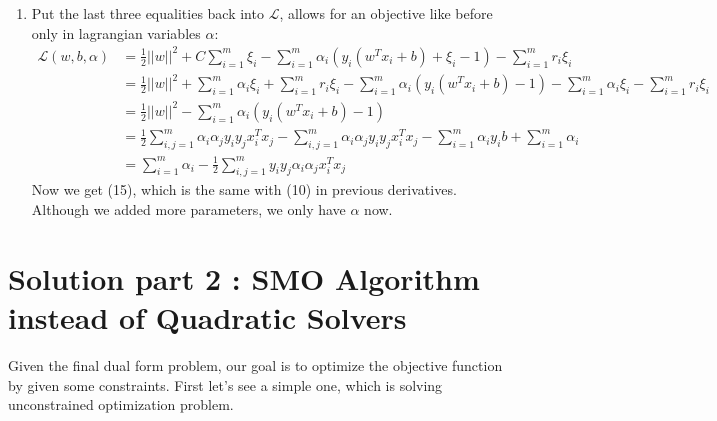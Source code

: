 \documentclass[a4paper]{article}
\begin{document}
\begin{enumerate}
\item{Put the last three equalities back into $\mathcal{L}$, allows for an objective like before only in lagrangian variables $\alpha$:
	\begin{align}
		\mathcal{L} (w, b, \alpha) &=  \frac{1}{2} ||w||^2 + C \sum_{i=1}^{m}\xi_i - \sum_{i=1}^{m}\alpha_i (y_i(w^T x_i +b) + \xi_i - 1) - \sum_{i=1}^{m}r_i \xi_i \nonumber \\
		&= \frac{1}{2} ||w||^2 + \sum_{i=1}^{m} \alpha_i  \xi_i+ \sum_{i=1}^{m} r_i \xi_i - \sum_{i=1}^{m}\alpha_i (y_i(w^T x_i +b) - 1) - \sum_{i=1}^{m} \alpha_i  \xi_i - \sum_{i=1}^{m} r_i \xi_i\nonumber \\
		&=\frac{1}{2} ||w||^2 - \sum_{i=1}^{m}\alpha_i (y_i(w^T x_i +b) - 1)  \nonumber \\
		&= \frac{1}{2} \sum_{i,j=1}^{m}\alpha_i \alpha_j y_i y_j x_i^T x_j - \sum_{i,j=1}^{m}\alpha_i \alpha_j y_i y_j x_i^T x_j - \sum_{i=1}^{m} \alpha_i y_i b + \sum_{i=1}^{m} \alpha_i \nonumber \\
		&=  \sum_{i=1}^{m} \alpha_i - \frac{1}{2} \sum_{i,j=1}^{m} y_i y_j \alpha_i \alpha_j x_i^T x_j
	\end{align}
	Now we get (15), which is the same with (10) in previous derivatives. Although we added more parameters, we only have $\alpha$ now.
}


\end{enumerate}






\section{Solution part 2 : SMO Algorithm instead of Quadratic Solvers}
Given the final dual form problem, our goal is to optimize the objective function by given some constraints. First let's see a simple one, which is solving unconstrained optimization problem. 
\end{document}
